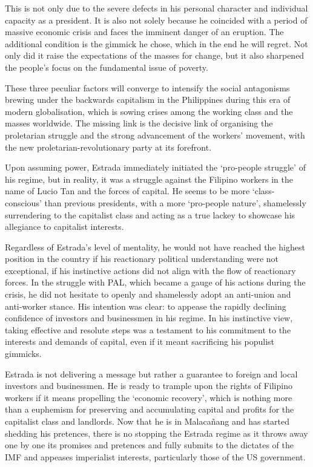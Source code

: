 This is not only due to the severe defects in his personal character 
and individual capacity as a president. 
It is also not solely because he coincided with a period 
of massive economic crisis and faces the imminent danger of an eruption. 
The additional condition is the gimmick he chose, 
which in the end he will regret. 
Not only did it raise the expectations of the masses for change, 
but it also sharpened the people's focus on the fundamental issue of poverty.

These three peculiar factors will converge to intensify the social antagonisms 
brewing under the backwards capitalism in the Philippines 
during this era of modern globalisation, 
which is sowing crises among the working class and the masses worldwide. 
The missing link is the decisive link of organising the proletarian struggle 
and the strong advancement of the workers' movement, 
with the new proletarian-revolutionary party at its forefront.

Upon assuming power, Estrada immediately initiated the `pro-people struggle' 
of his regime, but in reality, it was a struggle against the Filipino workers 
in the name of Lucio Tan and the forces of capital. 
He seems to be more `class-conscious' than previous presidents, 
with a more `pro-people nature', 
shamelessly surrendering to the capitalist class and acting as a true lackey 
to showcase his allegiance to capitalist interests.

Regardless of Estrada's level of mentality, 
he would not have reached the highest position in the country 
if his reactionary political understanding were not exceptional, 
if his instinctive actions did not align with the flow of reactionary forces. 
In the struggle with PAL, which became a gauge of his actions during the crisis, 
he did not hesitate to openly and shamelessly 
adopt an anti-union and anti-worker stance. 
His intention was clear: to appease the rapidly declining confidence 
of investors and businessmen in his regime. 
In his instinctive view, taking effective and resolute steps was a testament 
to his commitment to the interests and demands of capital, 
even if it meant sacrificing his populist gimmicks.

Estrada is not delivering a message but rather a guarantee to foreign 
and local investors and businessmen. 
He is ready to trample upon the rights of Filipino workers if it means 
propelling the `economic recovery', 
which is nothing more than a euphemism for preserving and accumulating capital 
and profits for the capitalist class and landlords. 
Now that he is in Malacañang and has started shedding his pretences, 
there is no stopping the Estrada regime as it throws away one by one 
its promises and pretences and fully submits to the dictates of the IMF 
and appeases imperialist interests, 
particularly those of the US government.

